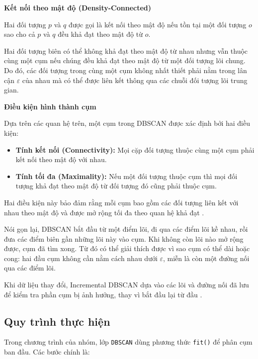 \textbf{Kết nối theo mật độ (Density-Connected)}

Hai đối tượng \(p\) và \(q\) được gọi là kết nối theo mật độ nếu tồn tại một đối tượng \(o\) sao cho cả \(p\) và \(q\) đều khả đạt theo mật độ từ \(o\).

Hai đối tượng biên có thể không khả đạt theo mật độ từ nhau nhưng vẫn thuộc cùng một cụm nếu chúng đều khả đạt theo mật độ từ một đối tượng lõi chung. Do đó, các đối tượng trong cùng một cụm không nhất thiết phải nằm trong lân cận \(\varepsilon\) của nhau mà có thể được liên kết thông qua các chuỗi đối tượng lõi trung gian.

\textbf{Điều kiện hình thành cụm}

Dựa trên các quan hệ trên, một cụm trong DBSCAN được xác định bởi hai điều kiện:

\begin{itemize}
    \item \textbf{Tính kết nối (Connectivity):} Mọi cặp đối tượng thuộc cùng một cụm phải kết nối theo mật độ với nhau.

    \item \textbf{Tính tối đa (Maximality):} Nếu một đối tượng thuộc cụm thì mọi đối tượng khả đạt theo mật độ từ đối tượng đó cũng phải thuộc cụm.
\end{itemize}

Hai điều kiện này bảo đảm rằng mỗi cụm bao gồm các đối tượng liên kết với nhau theo mật độ và được mở rộng tối đa theo quan hệ khả đạt \parencite{ester1996dbscan}.

Nói gọn lại, DBSCAN bắt đầu từ một điểm lõi, đi qua các điểm lõi kề nhau, rồi đưa các điểm biên gần những lõi này vào cụm. Khi không còn lõi nào mở rộng được, cụm đã tìm xong. Từ đó có thể giải thích được vì sao cụm có thể dài hoặc cong: hai đầu cụm không cần nằm cách nhau dưới \(\varepsilon\), miễn là còn một đường nối qua các điểm lõi.

Khi dữ liệu thay đổi, Incremental DBSCAN dựa vào các lõi và đường nối đã lưu để kiểm tra phần cụm bị ảnh hưởng, thay vì bắt đầu lại từ đầu \parencite{ester1998incrementaldbscan}.

\subsection{Quy trình thực hiện}

Trong chương trình của nhóm, lớp \texttt{DBSCAN} dùng phương thức \texttt{fit()} để phân cụm ban đầu. Các bước chính là:

